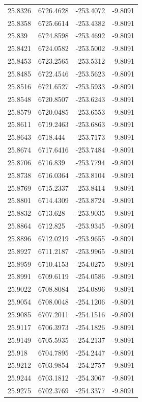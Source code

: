 \begin{table}[H]
\begin{tabular}{llll}
25.8326 & 6726.4628 & -253.4072 & -9.8091 \\
25.8358 & 6725.6614 & -253.4382 & -9.8091 \\
25.839 & 6724.8598 & -253.4692 & -9.8091 \\
25.8421 & 6724.0582 & -253.5002 & -9.8091 \\
25.8453 & 6723.2565 & -253.5312 & -9.8091 \\
25.8485 & 6722.4546 & -253.5623 & -9.8091 \\
25.8516 & 6721.6527 & -253.5933 & -9.8091 \\
25.8548 & 6720.8507 & -253.6243 & -9.8091 \\
25.8579 & 6720.0485 & -253.6553 & -9.8091 \\
25.8611 & 6719.2463 & -253.6863 & -9.8091 \\
25.8643 & 6718.444 & -253.7173 & -9.8091 \\
25.8674 & 6717.6416 & -253.7484 & -9.8091 \\
25.8706 & 6716.839 & -253.7794 & -9.8091 \\
25.8738 & 6716.0364 & -253.8104 & -9.8091 \\
25.8769 & 6715.2337 & -253.8414 & -9.8091 \\
25.8801 & 6714.4309 & -253.8724 & -9.8091 \\
25.8832 & 6713.628 & -253.9035 & -9.8091 \\
25.8864 & 6712.825 & -253.9345 & -9.8091 \\
25.8896 & 6712.0219 & -253.9655 & -9.8091 \\
25.8927 & 6711.2187 & -253.9965 & -9.8091 \\
25.8959 & 6710.4153 & -254.0275 & -9.8091 \\
25.8991 & 6709.6119 & -254.0586 & -9.8091 \\
25.9022 & 6708.8084 & -254.0896 & -9.8091 \\
25.9054 & 6708.0048 & -254.1206 & -9.8091 \\
25.9085 & 6707.2011 & -254.1516 & -9.8091 \\
25.9117 & 6706.3973 & -254.1826 & -9.8091 \\
25.9149 & 6705.5935 & -254.2137 & -9.8091 \\
25.918 & 6704.7895 & -254.2447 & -9.8091 \\
25.9212 & 6703.9854 & -254.2757 & -9.8091 \\
25.9244 & 6703.1812 & -254.3067 & -9.8091 \\
25.9275 & 6702.3769 & -254.3377 & -9.8091 \\

\end{tabular}
\end{table}
